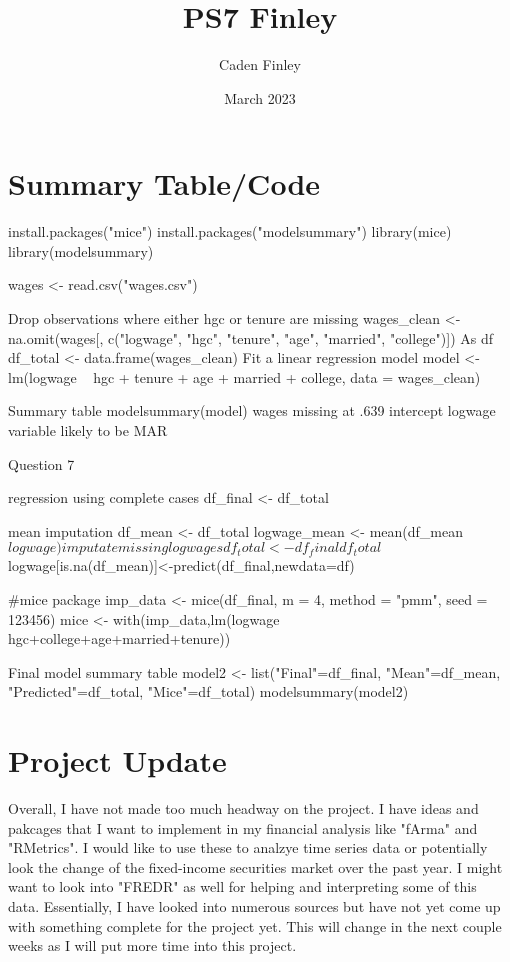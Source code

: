 \documentclass{article}
\title{PS7 Finley}
\author{Caden Finley}
\date{March 2023}
\begin{document}
\maketitle

\section{Summary Table/Code}
install.packages("mice")
install.packages("modelsummary")
library(mice)
library(modelsummary)

wages <- read.csv("wages.csv")

Drop observations where either hgc or tenure are missing
wages_clean <- na.omit(wages[, c("logwage", "hgc", "tenure", "age", "married", "college")])
As df
df_total <- data.frame(wages_clean)
Fit a linear regression model
model <- lm(logwage ~ hgc + tenure + age + married + college, data = wages_clean)

Summary table
modelsummary(model)
wages missing at .639 intercept 
logwage variable likely to be MAR


Question 7

regression using complete cases
df_final <- df_total %

mean imputation 
df_mean <- df_total
logwage_mean <- mean(df_mean$logwage)

imputate missing log wages
df_total <- df_final
df_total$logwage[is.na(df_mean)]<-predict(df_final,newdata=df)

#mice package
imp_data <- mice(df_final, m = 4, method = "pmm", seed = 123456)
mice <- with(imp_data,lm(logwage ~ hgc+college+age+married+tenure))

Final model summary table
model2 <- list("Final"=df_final, "Mean"=df_mean, "Predicted"=df_total, "Mice"=df_total)
modelsummary(model2)

\section{Project Update}

Overall, I have not made too much headway on the project. I have ideas and pakcages that I want to implement in my financial analysis like "fArma" and "RMetrics". I would like to use these to analzye time series data or potentially look the change of the fixed-income securities market over the past year. I might want to look into "FREDR" as well for helping and interpreting some of this data. Essentially, I have looked into numerous sources but have not yet come up with something complete for the project yet. This will change in the next couple weeks as I will put more time into this project. 
\end{document}
